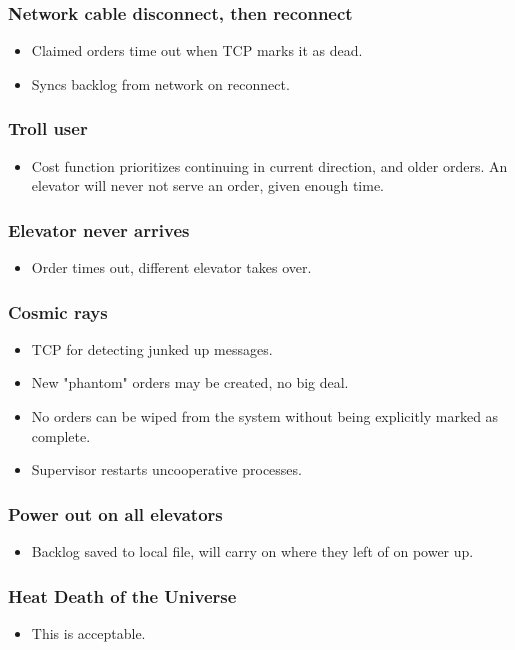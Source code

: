 \documentclass[11pt,a4paper]{article}
\begin{document}
\subsubsection*{Network cable disconnect, then reconnect}
\begin{itemize}
\item Claimed orders time out when TCP marks it as dead.
\item Syncs backlog from network on reconnect.
\end{itemize}
\subsubsection*{Troll user}
\begin{itemize}
\item Cost function prioritizes continuing in current direction, and older orders. An elevator will never not serve an order, given enough time.
\end{itemize}
\subsubsection*{Elevator never arrives}
\begin{itemize}
\item Order times out, different elevator takes over.
\end{itemize}
\subsubsection*{Cosmic rays}
\begin{itemize}
\item TCP for detecting junked up messages.
\item New "phantom" orders may be created, no big deal.
\item No orders can be wiped from the system without being explicitly marked as complete.
\item Supervisor restarts uncooperative processes.
\end{itemize}
\subsubsection*{Power out on all elevators}
\begin{itemize}
\item Backlog saved to local file, will carry on where they left of on power up.
\end{itemize}
\subsubsection*{Heat Death of the Universe}
\begin{itemize}
\item This is acceptable.
\end{itemize}
\end{document}
